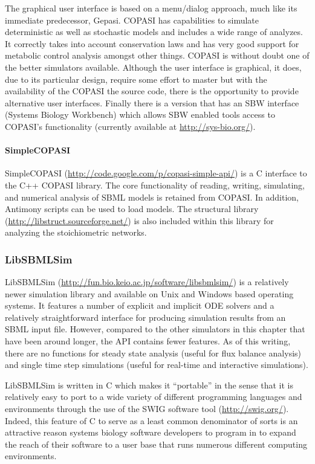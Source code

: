 The graphical user interface is based on a menu/dialog approach, much
like its immediate predecessor, Gepasi. COPASI has capabilities to
simulate deterministic as well as stochastic models and includes a wide
range of analyzes. It correctly takes into account conservation laws and
has very good support for metabolic control analysis amongst other
things. COPASI is without doubt one of the better simulators available.
Although the user interface is graphical, it does, due to its particular
design, require some effort to master but with the availability of the
COPASI the source code, there is the opportunity to provide alternative
user interfaces. Finally there is a version that has an SBW interface
(Systems Biology Workbench) which allows SBW enabled tools access to
COPASI's functionality (currently available at
\url{http://sys-bio.org/}).

\paragraph{SimpleCOPASI}

SimpleCOPASI (\url{http://code.google.com/p/copasi-simple-api/}) is a C
interface to the C++ COPASI library. The core functionality of reading,
writing, simulating, and numerical analysis of SBML models is retained
from COPASI. In addition, Antimony scripts can be used to load models.
The structural library (\url{http://libstruct.sourceforge.net/}) is also
included within this library for analyzing the stoichiometric networks.

\subsubsection{LibSBMLSim}

LibSBMLSim (\url{http://fun.bio.keio.ac.jp/software/libsbmlsim/}) is a
relatively newer simulation library and available on Unix and Windows
based operating systems. It features a number of explicit and implicit
ODE solvers and a relatively straightforward interface for producing
simulation results from an SBML input file. However, compared to the
other simulators in this chapter that have been around longer, the API
contains fewer features. As of this writing, there are no functions for
steady state analysis (useful for flux balance analysis) and single time
step simulations (useful for real-time and interactive simulations).

LibSBMLSim is written in C which makes it ``portable'' in the sense that
it is relatively easy to port to a wide variety of different programming
languages and environments through the use of the SWIG software tool
(\url{http://swig.org/}). Indeed, this feature of C to serve as a least
common denominator of sorts is an attractive reason systems biology
software developers to program in to expand the reach of their software
to a user base that runs numerous different computing environments.

